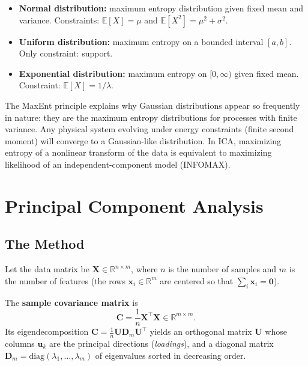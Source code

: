 \documentclass[11pt, oneside]{book}
\newcommand{\R}{\mathbb{R}}
\newcommand{\E}{\mathbb{E}}
\newcommand{\T}{^{\top}}
\begin{document}
\begin{exbox}[title={Standard MaxEnt examples}]
\begin{itemize}
  \item \textbf{Normal distribution:} maximum entropy distribution given fixed mean and
        variance. Constraints: $\E[X] = \mu$ and $\E[X^2] = \mu^2 + \sigma^2$.
  \item \textbf{Uniform distribution:} maximum entropy on a bounded interval $[a,b]$.
        Only constraint: support.
  \item \textbf{Exponential distribution:} maximum entropy on $[0,\infty)$ given fixed mean.
        Constraint: $\E[X] = 1/\lambda$.
\end{itemize}
\end{exbox}

\begin{intbox}
  The MaxEnt principle explains why Gaussian distributions appear so frequently in
  nature: they are the maximum entropy distributions for processes with finite variance.
  Any physical system evolving under energy constraints (finite second moment) will
  converge to a Gaussian-like distribution.
  In ICA, maximizing entropy of a nonlinear transform of the data is equivalent to
  maximizing likelihood of an independent-component model (INFOMAX).
\end{intbox}


\chapter{Principal Component Analysis}

\section{The Method}

Let the data matrix be $\bm{X} \in \R^{n \times m}$, where $n$ is the number of samples
and $m$ is the number of features (the rows $\bm{x}_i \in \R^m$ are centered so that
$\sum_i \bm{x}_i = \bm{0}$).

The \textbf{sample covariance matrix} is
\[
  \bm{C} = \frac{1}{n}\bm{X}\T\bm{X} \in \R^{m \times m}.
\]
Its eigendecomposition $\bm{C} = \frac{1}{n}\bm{U}\bm{D}_m\bm{U}\T$ yields an orthogonal
matrix $\bm{U}$ whose columns $\bm{u}_k$ are the principal directions (\emph{loadings}),
and a diagonal matrix $\bm{D}_m = \mathrm{diag}(\lambda_1,\ldots,\lambda_m)$ of
eigenvalues sorted in decreasing order.
\end{document}

